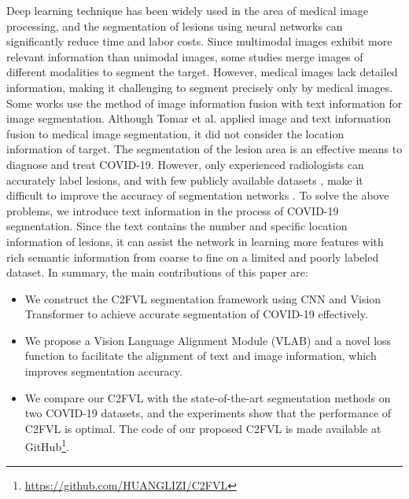 \documentclass{article}
\begin{document}
Deep learning technique has been widely used in the area of medical image processing, and the segmentation of lesions using neural networks can significantly reduce time and labor costs. Since multimodal images exhibit more relevant information \cite{naik2020denouements} than unimodal images, some studies \cite{dolz2018hyperdense,fu2021multimodal} merge images of different modalities to segment the target. 
However, medical images lack detailed information, making it challenging to segment precisely only by medical images. Some works \cite{radford2021learning,lu2019vilbert,li2022lvit} use the method of image information fusion with text information for image segmentation. Although Tomar et al. \cite{tomar2022tganet} applied image and text information fusion to medical image segmentation, it did not consider the location information of target. The segmentation of the lesion area is an effective means to diagnose and treat COVID-19. However, only experienced radiologists can accurately label lesions, and with few publicly available datasets \cite{kugunavar2021convolutional}, make it difficult to improve the accuracy of segmentation networks \cite{xu2022mrdff,saeedizadeh2021covid,alom2020covid_mtnet}. To solve the above problems, we introduce text information in the process of COVID-19 segmentation. Since the text contains the number and specific location information of lesions, it can assist the network in learning more features with rich semantic information from coarse to fine on a limited and poorly labeled dataset. In summary, the main contributions of this paper are:
\begin{itemize}
\item We construct the C2FVL segmentation framework using CNN and Vision Transformer to achieve accurate segmentation of COVID-19 effectively.
\item We propose a Vision Language Alignment Module (VLAB) and a novel loss function to facilitate the alignment of text and image information, which improves segmentation accuracy.
\item We compare our C2FVL with the state-of-the-art segmentation methods on two COVID-19 datasets, and the experiments show that the performance of C2FVL is optimal. The code of our proposed C2FVL is made available at GitHub\footnote{\href{https://github.com/HUANGLIZI/C2FVL}{https://github.com/HUANGLIZI/C2FVL}}.
\end{itemize}
\vspace{-3mm}
\end{document}
